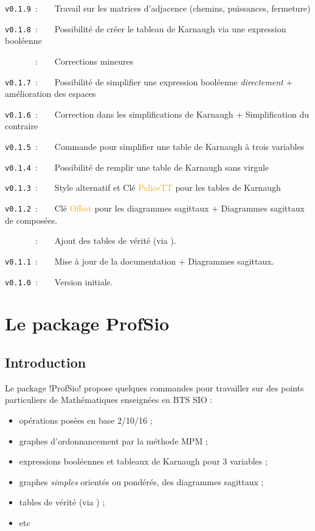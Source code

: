 \documentclass[french,a4paper,11pt]{article}
\newcommand\Cle[1]{{\small\sffamily\textlangle \textcolor{orange}{#1}\textrangle}}
\begin{document}
{{\verb|v0.1.9|~:~~~~Travail sur les matrices d'adjacence (chemins, puissances, fermeture)

\verb|v0.1.8|~:~~~~Possibilité de créer le tableau de Karnaugh via une expression booléenne

\verb|      |~:~~~~Corrections mineures

\verb|v0.1.7|~:~~~~Possibilité de simplifier une expression booléenne \textit{directement} + amélioration des espaces

\verb|v0.1.6|~:~~~~Correction dans les simplifications de Karnaugh + Simplification du contraire

\verb|v0.1.5|~:~~~~Commande pour simplifier une table de Karnaugh à trois variables

\verb|v0.1.4|~:~~~~Possibilité de remplir une table de Karnaugh sans virgule

\verb|v0.1.3|~:~~~~Style alternatif et Clé \Cle{PoliceTT} pour les tables de Karnaugh

\verb|v0.1.2|~:~~~~Clé \Cle{Offset} pour les diagrammes sagittaux + Diagrammes sagittaux de composées.

\verb|      |~:~~~~Ajout des tables de vérité (via ).

\verb|v0.1.1|~:~~~~Mise à jour de la documentation + Diagrammes sagittaux.

\verb|v0.1.0|~:~~~~Version initiale.

\newpage

\section{Le package ProfSio}

\subsection{Introduction}

\begin{noteblock}
Le package \packagetex!ProfSio! propose quelques commandes pour travailler sur des points particuliers de Mathématiques enseignées en BTS SIO :

\begin{itemize}
	\item opérations posées en base 2/10/16 ;
	\item graphes d'ordonnancement par la méthode MPM ;
	\item expressions booléennes et tableaux de Karnaugh pour 3 variables ;
	\item graphes \textit{simples} orientés ou pondérés, des diagrammes sagittaux ;
	\item tables de vérité (via ) ;
	\item etc
\end{itemize}
\vspace*{-\baselineskip}\leavevmode
\end{noteblock}

}}
\end{document}
